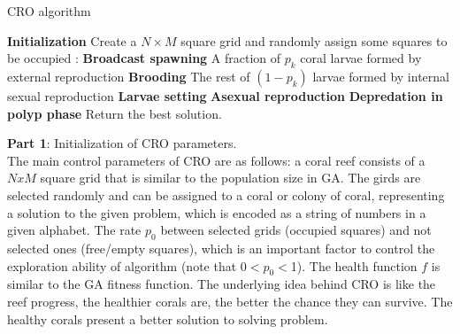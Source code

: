 \documentclass[smallcondensed, natbib]{svjour3}     %
\begin{document}
\begin{algorithm}
\caption{CRO algorithm}\label{algo_CRO}
\begin{algorithmic}[1]
   \State \textbf{Initialization} \newline
   \hspace*{\algorithmicindent}Create a $N \times M$ square grid and randomly assign some squares to be occupied
   :
   \State \textbf{Broadcast spawning} \newline
   \hspace*{\algorithmicindent} \hspace*{\algorithmicindent} A fraction of $p_{k}$ coral larvae formed by external reproduction
   \State \textbf{Brooding} \newline
   \hspace*{\algorithmicindent} \hspace*{\algorithmicindent} The rest of $(1 - p_{k})$ larvae formed by internal sexual reproduction
   \State \textbf{Larvae setting} %
   \State \textbf{Asexual reproduction} %
	\State \textbf{Depredation in polyp phase} 
   \EndWhile
   \State Return the best solution.           
\end{algorithmic}
\end{algorithm}

\textbf{Part 1}: Initialization of CRO parameters.\\
The main control parameters of CRO are as follows: a coral reef consists of a $NxM$ square grid that is similar to the population size in GA. The girds are selected randomly and can be assigned to a coral or colony of coral, representing a solution to the given problem, which is encoded as a string of numbers in a given alphabet. The rate $p_{0}$ between selected grids (occupied squares) and not selected ones (free/empty squares), which is an important factor to control the exploration ability of algorithm (note that 0$<p_{0}<$1). The health function $f$ is similar to the GA fitness function. The underlying idea behind CRO is like the reef progress, the healthier corals are, the better the chance they can survive. The healthy corals present a better solution to solving problem.\\
\end{document}

